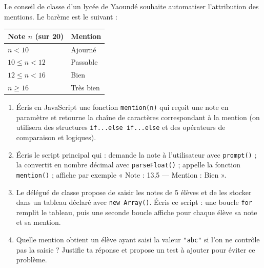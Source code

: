 \documentclass[11pt]{article}
\begin{document}
\begin{exercice}
Le conseil de classe d'un lycée de Yaoundé souhaite automatiser l'attribution des mentions. Le barème est le suivant :
\begin{center}
\begin{tabularx}{\linewidth}{|l|X|}
\hline
\rowcolor{popblueL} \textbf{Note $n$ (sur 20)} & \textbf{Mention} \\
\hline
$n < 10$ & Ajourné \\
\hline
$10 \leq n < 12$ & Passable \\
\hline
$12 \leq n < 16$ & Bien \\
\hline
$n \geq 16$ & Très bien \\
\hline
\end{tabularx}
\end{center}
\begin{enumerate}
\item Écris en JavaScript une fonction \texttt{mention(n)} qui reçoit une note en paramètre et retourne la chaîne de caractères correspondant à la mention (on utilisera des structures \texttt{if...else if...else} et des opérateurs de comparaison et logiques).
\item Écris le script principal qui : demande la note à l'utilisateur avec \texttt{prompt()} ; la convertit en nombre décimal avec \texttt{parseFloat()} ; appelle la fonction \texttt{mention()} ; affiche par exemple « Note : 13,5 — Mention : Bien ».
\item Le délégué de classe propose de saisir les notes de 5 élèves et de les stocker dans un tableau déclaré avec \texttt{new Array()}. Écris ce script : une boucle \texttt{for} remplit le tableau, puis une seconde boucle affiche pour chaque élève sa note et sa mention.
\item Quelle mention obtient un élève ayant saisi la valeur \texttt{"abc"} si l'on ne contrôle pas la saisie ? Justifie ta réponse et propose un test à ajouter pour éviter ce problème.
\end{enumerate}
\end{exercice}
\end{document}
